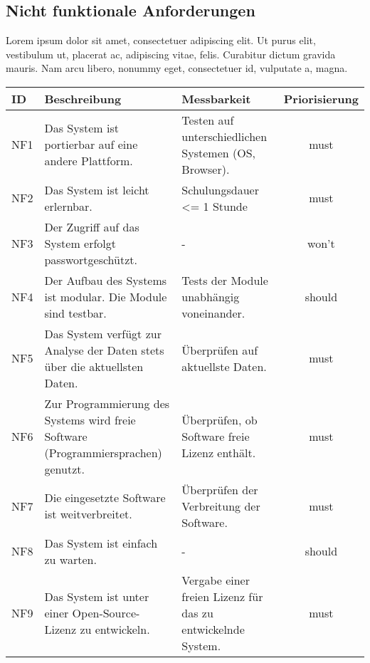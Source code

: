 \subsection{Nicht funktionale Anforderungen}
Lorem ipsum dolor sit amet, consectetuer adipiscing elit. Ut purus elit, vestibulum ut, 
placerat ac, adipiscing vitae, felis. Curabitur dictum gravida mauris. Nam arcu libero, nonummy eget, consectetuer id, vulputate a, magna.
\begingroup
\setlength{\tabcolsep}{9pt} %
\renewcommand{\arraystretch}{1.0} 
\begin{table}[H]
    \centering
    \begin{adjustbox}{max width=\textwidth}
    \begin{tabular}{lp{7.0cm}p{7.0cm}c}
       \toprule
       \textbf{ID}          & \textbf{Beschreibung} & \textbf{Messbarkeit} & \textbf{Priorisierung}\\
       \midrule
        NF1                               &Das System ist portierbar auf eine andere Plattform. & Testen auf unterschiedlichen Systemen (OS, Browser). & must\\
        NF2                               &Das System ist leicht erlernbar.& Schulungsdauer <= 1 Stunde  & must\\
        NF3                               &Der Zugriff auf das System erfolgt passwortgeschützt. & -  & won't\\
        NF4                               &Der Aufbau des Systems ist modular. Die Module sind testbar. & Tests der Module unabhängig voneinander. & should\\
        NF5                               &Das System verfügt zur Analyse der Daten stets über die aktuellsten Daten. & Überprüfen auf aktuellste Daten. & must\\
        NF6                               &Zur Programmierung des Systems wird freie Software (Programmiersprachen) genutzt. & Überprüfen, ob Software freie Lizenz enthält.  & must\\
        NF7                               &Die eingesetzte Software ist weitverbreitet. & Überprüfen der Verbreitung der Software. & must\\
        NF8                               &Das System ist einfach zu warten. & - & should\\
        NF9                               &Das System ist unter einer Open-Source-Lizenz zu entwickeln. & Vergabe einer freien Lizenz für das zu entwickelnde System.  & must\\

\end{tabular}
\end{adjustbox}
\end{table}
